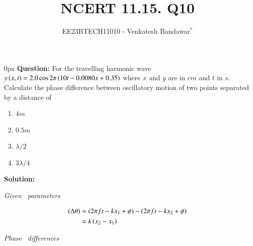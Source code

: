 \documentclass[journal,12pt,twocolumn]{IEEEtran}
\theoremstyle{remark}
\begin{document}

\vspace{3cm}

\title{NCERT 11.15. Q10}
\author{EE23BTECH11010 - Venkatesh Bandawar$^{*}$%
}
\maketitle
\newpage
\bigskip

\renewcommand{\thefigure}{\arabic{figure}}
\renewcommand{\thetable}{\arabic{table}}



\parindent 0px
\textbf{Question:} For the travelling harmonic wave
$y\left(x, t\right) = 2.0 \cos 2\pi \left(10t - 0.0080 x + 0.35\right)$ where $x$ and $y$ are in $cm$ and $t$ in $s$. Calculate the phase difference between oscillatory
motion of two points separated by a distance of 

\begin{enumerate} [label=(\alph*)]
    \item $4 m$
    \item $0.5 m$
    \item $\lambda/2$
    \item $3\lambda/4$
\end{enumerate}

\textbf{Solution:}  
\begin{table}[htbp] \small
\centering

\caption{\normalsize\textsl{Given \, parameters}}
\label{given parameters list}
\end{table}
\vspace{-1cm}
\begin{align}
    \left(\Delta \theta\right) &= \left( 2\pi f t - kx_1 + \phi\right)  - \left(2\pi f t -kx_2 + \phi\right)\\
    &= k\left(x_2 - x_1\right) 
\end{align}

\begin{table}[htbp] 
\centering

\caption{\normalsize\textsl{Phase \, differences}}
\label{Solution}
\end{table}

\end{document}
